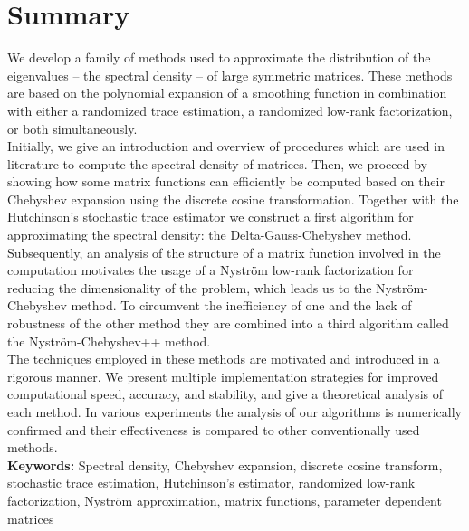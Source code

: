 \chapter*{Summary}
\label{chp:0-summary}

We develop a family of methods used to approximate the distribution of the eigenvalues -- the spectral density --
of large symmetric matrices. These methods are based on the polynomial expansion
of a smoothing function in combination with either a randomized trace estimation,
a randomized low-rank factorization, or both simultaneously.\\

Initially, we give an introduction and overview of procedures which are used in literature
to compute the spectral density of matrices. Then, we proceed by showing how
some matrix functions can efficiently be computed based on
their Chebyshev expansion using the discrete cosine transformation.
Together with the Hutchinson's stochastic trace estimator we construct a first
algorithm for approximating the spectral density: the Delta-Gauss-Chebyshev method.
Subsequently, an analysis of the structure of a matrix function involved in the computation
motivates the usage of a Nystr\"om low-rank factorization for reducing the
dimensionality of the problem, which leads us to the Nystr\"om-Chebyshev method.
To circumvent the inefficiency of one and the lack of robustness of the other
method they are combined into a third algorithm called the
Nystr\"om-Chebyshev++ method.\\

The techniques employed in these methods are motivated and introduced in a
rigorous manner. We present multiple implementation strategies for improved
computational speed, accuracy, and stability, and give a theoretical analysis
of each method. In various experiments the analysis of our algorithms is
numerically confirmed and their effectiveness is compared to other
conventionally used methods.\\

\textbf{Keywords:} Spectral density, Chebyshev expansion, discrete cosine transform, stochastic trace estimation,
Hutchinson's estimator, randomized low-rank factorization, Nystr\"om approximation,
matrix functions, parameter dependent matrices
